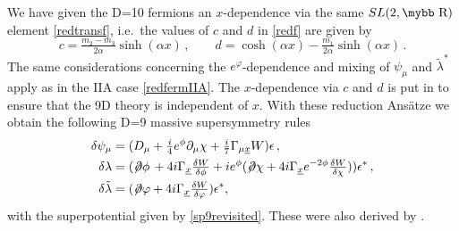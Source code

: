 \documentclass[12pt,a4paper]{article}
\def\bb#1{\hbox{\mybb#1}}
\begin{document}
We have given the D=10 fermions an $x$-dependence via the same
$SL(2,\bb{R})$ element \eqref{redtransf}, i.e.~the values of $c$ and $d$
in \eqref{redf} are given by
\begin{equation}
  c=\tfrac{m_2-m_3}{2 \alpha} \sinh(\alpha x) \,, \qquad
  d=\cosh(\alpha x) - \tfrac{m_1}{2 \alpha} \sinh(\alpha x) \,.
\end{equation}
%
The same considerations concerning the $e^{\varphi}$-dependence and
mixing of $\psi_\mu$ and $\tilde{\lambda}^*$ apply as in the IIA case
\eqref{redfermIIA}. The $x$-dependence via $c$ and $d$ is put in to
ensure that the 9D theory is independent of $x$.
With these reduction Ans\"atze we obtain the following D=9 massive
supersymmetry rules
\begin{equation}
\begin{aligned}
  \delta \psi_\mu & = (D_\mu
    +\tfrac{i}{4} e^\phi \partial_\mu \chi
    +\tfrac{i}{7} \Gamma_{\mu \underline x} W ) \epsilon \,, \\
  \delta \lambda
  & = (\not \! \partial \phi\,  + 4 i \Gamma_{\underline x} \tfrac{\delta W}{\delta \phi}
    + i e^\phi (\not \! \partial \chi + 4 i \Gamma_{\underline x} e^{-2 \phi}
    \tfrac{\delta W}{\delta \chi}) ) \epsilon^* \,, \\
  \delta \tilde{\lambda}
  & =  (\not \! \partial \varphi + 4 i \Gamma_{\underline x}
    \tfrac{\delta W}{\delta \varphi} ) \epsilon^*,
\end{aligned}
\label{D9susyrules}
\end{equation}
%
with the superpotential given by \eqref{sp9revisited}. These were also derived
by \cite{Gheerardyn:2001jj}.
\end{document}
